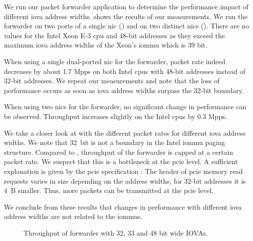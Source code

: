 We run our packet forwarder application to determine the performance impact of
different \ac{iova} address widths. 
shows the results of our measurements. We run the forwarder on two ports of a
single \ac{nic} () and on
two distinct \acp{nic} ().
There are no values for the Intel Xeon E-3 \ac{cpu} and 48-bit addresses as they
exceed the maximum \ac{iova} address widths of the Xeon's \ac{iommu} which is 39
bit.

When using a single dual-ported \ac{nic} for the forwarder, packet rate indeed
decreases by about 1.7 Mpps on both Intel \acp{cpu} with 48-bit addresses
instead of 32-bit addresses. We repeat our measurements and note that the loss
of performance occurs as soon as \ac{iova} address widths surpass the 32-bit
boundary.

When using two \acp{nic} for the forwarder, no significant change in performance
can be observed. Throughput increases slightly on the Intel \acp{cpu} by 0.3
Mpps.

We take a closer look at 
with the different packet rates for different \ac{iova} address widths. We note
that 32~bit is not a boundary in the Intel \ac{iommu} paging structure. Compared
to , throughput of the
forwarder is capped at a certain packet rate. We suspect that this is a
bottleneck at the \ac{pcie} level. A sufficient explanation is given by the
\ac{pcie} specification \cite{pcie2017specification}: The header of \ac{pcie}
memory read requests varies in size depending on the address widths, for 32-bit
addresses it is 4~B smaller. Thus, more packets can be transmitted at the
\ac{pcie} level.

We conclude from these results that changes in performance with different
\ac{iova} address widths are not related to the \acp{iommu}.

\begin{figure}%
	\centering

    \caption{Throughput of forwarder with 32, 33 and 48 bit wide IOVAs.}
	\label{fig:iova-address-widths-throughput}
\end{figure}



